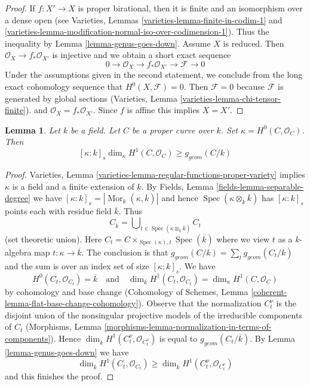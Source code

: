\documentclass{stacks-project}
\theoremstyle{plain}
\newtheorem{lemma}[subsection]{Lemma}
\theoremstyle{definition}
\theoremstyle{remark}
\numberwithin{equation}{subsection}
\def\Spec{\mathop{\mathrm{Spec}}}
\def\Mor{\mathop{\mathrm{Mor}}\nolimits}
\begin{document}
\begin{proof}
If $f : X' \to X$ is proper birational, then it is finite and
an isomorphism over a dense open (see
Varieties, Lemmas \ref{varieties-lemma-finite-in-codim-1} and
\ref{varieties-lemma-modification-normal-iso-over-codimension-1}).
Thus the inequality by Lemma \ref{lemma-genus-goes-down}.
Assume $X$ is reduced. Then $\mathcal{O}_X \to f_*\mathcal{O}_{X'}$
is injective and we obtain a short exact sequence
$$
0 \to \mathcal{O}_X \to f_*\mathcal{O}_{X'} \to \mathcal{F} \to 0
$$
Under the assumptions given in the second statement,
we conclude from the long exact cohomology sequence that
$H^0(X, \mathcal{F}) = 0$. Then $\mathcal{F} = 0$ because
$\mathcal{F}$ is generated by global sections
(Varieties, Lemma \ref{varieties-lemma-chi-tensor-finite}).
and $\mathcal{O}_X = f_*\mathcal{O}_{X'}$. Since $f$ is affine
this implies $X = X'$.
\end{proof}

\begin{lemma}
\label{lemma-bound-geometric-genus-curve}
Let $k$ be a field. Let $C$ be a proper curve over $k$.
Set $\kappa = H^0(C, \mathcal{O}_C)$. Then
$$
[\kappa : k]_s \dim_\kappa H^1(C, \mathcal{O}_C) \geq g_{geom}(C/k)
$$
\end{lemma}

\begin{proof}
Varieties, Lemma \ref{varieties-lemma-regular-functions-proper-variety}
implies $\kappa$ is a field and a finite extension of $k$.
By Fields, Lemma \ref{fields-lemma-separable-degree}
we have $[\kappa : k]_s = |\Mor_k(\kappa, \overline{k})|$
and hence $\Spec(\kappa \otimes_k \overline{k})$ has
$[\kappa : k]_s$ points each with residue field $\overline{k}$.
Thus
$$
C_{\overline{k}} =
\bigcup\nolimits_{t \in \Spec(\kappa \otimes_k \overline{k})} C_t
$$
(set theoretic union). Here
$C_t = C \times_{\Spec(\kappa), t} \Spec(\overline{k})$ where
we view $t$ as a $k$-algebra map $t : \kappa \to \overline{k}$.
The conclusion is that $g_{geom}(C/k) = \sum_t g_{geom}(C_t/\overline{k})$
and the sum is over an index set of size $[\kappa : k]_s$.
We have
$$
H^0(C_t, \mathcal{O}_{C_t}) = \overline{k}
\quad\text{and}\quad
\dim_{\overline{k}} H^1(C_t, \mathcal{O}_{C_t}) =
\dim_\kappa H^1(C, \mathcal{O}_C)
$$
by cohomology and base change
(Cohomology of Schemes, Lemma \ref{coherent-lemma-flat-base-change-cohomology}).
Observe that the normalization $C_t^\nu$ is the disjoint
union of the nonsingular projective models of the
irreducible components of $C_t$
(Morphisms, Lemma \ref{morphisms-lemma-normalization-in-terms-of-components}).
Hence $\dim_{\overline{k}} H^1(C_t^\nu, \mathcal{O}_{C_t^\nu})$
is equal to $g_{geom}(C_t/\overline{k})$.
By Lemma \ref{lemma-genus-goes-down} we have
$$
\dim_{\overline{k}} H^1(C_t, \mathcal{O}_{C_t}) \geq
\dim_{\overline{k}} H^1(C_t^\nu, \mathcal{O}_{C_t^\nu})
$$
and this finishes the proof.
\end{proof}
\end{document}
